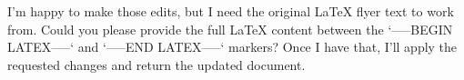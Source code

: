 I’m happy to make those edits, but I need the original LaTeX flyer text to work from. Could you please provide the full LaTeX content between the `-----BEGIN LATEX-----` and `-----END LATEX-----` markers? Once I have that, I’ll apply the requested changes and return the updated document.